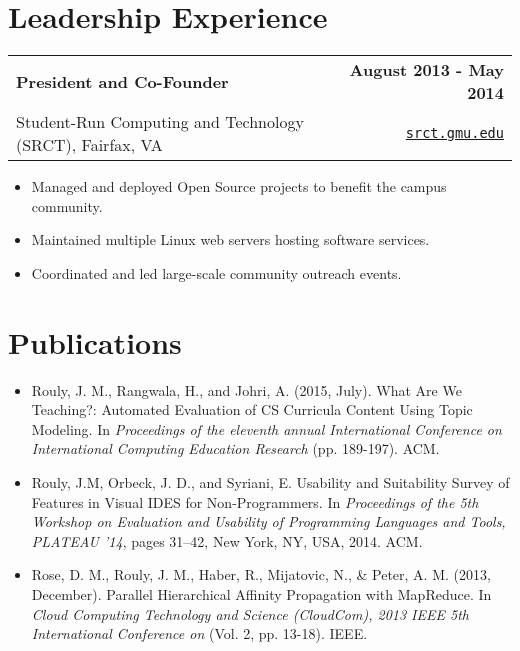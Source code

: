 \documentclass[letterpaper]{article}
\newenvironment{details}
{\begin{itemize}}
{\end{itemize}}
\begin{document}
  \section{Leadership Experience}
  \noindent
  \begin{tabularx}{\textwidth}{@{}X r@{}}
    \textbf{President and Co-Founder} & \textbf{August 2013 - May 2014} \\
    Student-Run Computing and Technology (SRCT), Fairfax, VA & \texttt{\href{srct.gmu.edu}{srct.gmu.edu}}
  \end{tabularx}

  \begin{details}
  \item Managed and deployed Open Source projects to benefit the campus community.
  \item Maintained multiple Linux web servers hosting software services.
  \item Coordinated and led large-scale community outreach events.
  \end{details}


  \section{Publications}
  \noindent
  \begin{details}
  \item Rouly, J. M., Rangwala, H., and Johri, A. (2015, July). What Are We
  Teaching?: Automated Evaluation of CS Curricula Content Using Topic
  Modeling. In \emph{Proceedings of the eleventh annual International
  Conference on International Computing Education Research} (pp. 189-197). ACM.

  \item Rouly, J.M, Orbeck, J. D., and Syriani, E.
  Usability and Suitability Survey of Features in Visual IDES for
  Non-Programmers. In \emph{Proceedings of the 5th Workshop on Evaluation
  and Usability of Programming Languages and Tools, PLATEAU '14}, pages
  31–42, New York, NY, USA, 2014. ACM.

  \item Rose, D. M., Rouly, J. M., Haber, R., Mijatovic, N., \& Peter, A.
  M. (2013, December). Parallel Hierarchical Affinity Propagation with
  MapReduce. In \emph{Cloud Computing Technology and Science (CloudCom),
  2013 IEEE 5th International Conference on} (Vol. 2, pp. 13-18). IEEE.
  \end{details}


\end{document}
